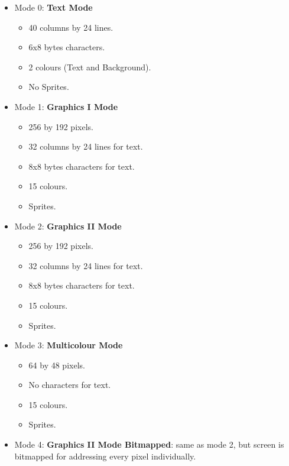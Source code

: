 \documentclass[a4paper,11pt]{article}
\begin{document}
    \begin{itemize}
        \item Mode 0: \textbf{Text Mode}
        \begin{itemize}
            \item 40 columns by 24 lines.
            \item 6x8 bytes characters.
            \item 2 colours (Text and Background).
            \item No Sprites.
        \end{itemize}
        \item Mode 1: \textbf{Graphics I Mode}
        \begin{itemize}
            \item 256 by 192 pixels.
            \item 32 columns by 24 lines for text.
            \item 8x8 bytes characters for text.
            \item 15 colours.
            \item Sprites.
        \end{itemize}
        \item Mode 2: \textbf{Graphics II Mode}
        \begin{itemize}
            \item 256 by 192 pixels.
            \item 32 columns by 24 lines for text.
            \item 8x8 bytes characters for text.
            \item 15 colours.
            \item Sprites.
        \end{itemize}
        \item Mode 3: \textbf{Multicolour Mode}
        \begin{itemize}
            \item 64 by 48 pixels.
            \item No characters for text.
            \item 15 colours.
            \item Sprites.
        \end{itemize}
        \item Mode 4: \textbf{Graphics II Mode Bitmapped}: same as mode 2, but
        screen is bitmapped for addressing every pixel individually.
    \end{itemize}

    \pagebreak
    
    
\end{document}
